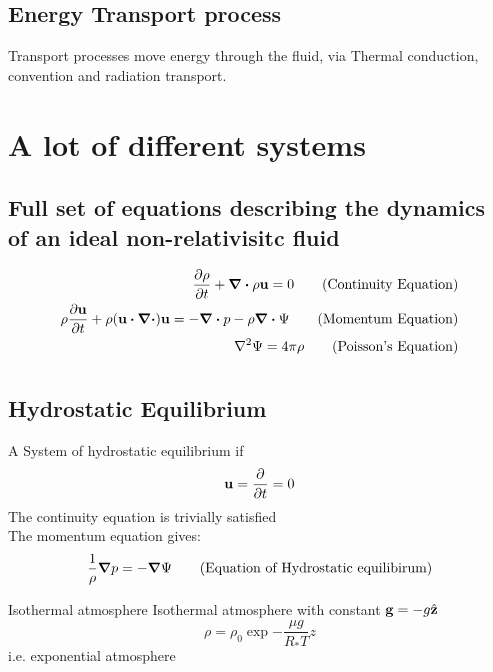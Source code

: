 \documentclass[12pt,a4paper]{article}
\begin{document}
    \subsection{Energy Transport process}
        Transport processes move energy through the fluid, via
        Thermal conduction, convention and radiation transport.
\section{A lot of different systems}
    \subsection{Full set of equations describing the dynamics of an ideal non-relativisitc fluid}
        \begin{align*}
            \pdv{\rho}{t} + \div{\rho \vb{u}} = 0 \tag{Continuity Equation}\\
            \rho \pdv{\vb{u}}{t}+\rho (\vb{u}\dotproduct \div)\vb{u}=-\div{p}-\rho\div{\Psi}\tag{Momentum Equation}\\
            \laplacian{\Psi} = 4\pi\rho \tag{Poisson's Equation}\\
        \end{align*}
        \begin{equation}
            \tag{Energy Equation}
        \end{equation}
        \begin{equation}
            \tag{Definition fo Total energy}
        \end{equation}
        \begin{equation}
            \tag{EoS of total energy}
        \end{equation}
        \begin{equation}
            \tag{Internal Energy}
        \end{equation}
    \subsection{Hydrostatic Equilibrium}
        A System of hydrostatic equilibrium if 
        \begin{equation}
            \vb{u} = \pdv{}{t} =0
        \end{equation}
        The continuity equation is trivially satisfied\\        
        The momentum equation gives:
        \begin{equation}
            \frac{1}{\rho}\grad{p} = - \grad{\Psi}\tag{Equation of Hydrostatic equilibirum}
        \end{equation}
        \begin{example}
            {Isothermal atmosphere}{
                Isothermal atmosphere with constant $\vb{g}=-g\hat{\vb{z}}$
                \begin{equation}
                    \rho = \rho_0 \exp{-\frac{\mu g} {R_{*} T} z}
                \end{equation}
                i.e. exponential atmosphere
            }
        \end{example}
\end{document}
